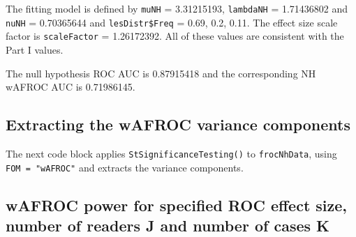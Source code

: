 \documentclass[
]{book}
\newenvironment{Shaded}{\begin{snugshade}}{\end{snugshade}}
\newcommand{\AttributeTok}[1]{\textcolor[rgb]{0.77,0.63,0.00}{#1}}
\newcommand{\FunctionTok}[1]{\textcolor[rgb]{0.00,0.00,0.00}{#1}}
\newcommand{\NormalTok}[1]{#1}
\newcommand{\OtherTok}[1]{\textcolor[rgb]{0.56,0.35,0.01}{#1}}
\newcommand{\SpecialCharTok}[1]{\textcolor[rgb]{0.00,0.00,0.00}{#1}}
\newcommand{\StringTok}[1]{\textcolor[rgb]{0.31,0.60,0.02}{#1}}
\begin{document}
The fitting model is defined by \texttt{muNH} = 3.31215193, \texttt{lambdaNH} = 1.71436802 and \texttt{nuNH} = 0.70365644 and \texttt{lesDistr\$Freq} = 0.69, 0.2, 0.11. The effect size scale factor is \texttt{scaleFactor} = 1.26172392. All of these values are consistent with the Part I values.

\begin{Shaded}
\end{Shaded}

The null hypothesis ROC AUC is 0.87915418 and the corresponding NH wAFROC AUC is 0.71986145.

\hypertarget{extracting-the-wafroc-variance-components}{%
\subsection{Extracting the wAFROC variance components}\label{extracting-the-wafroc-variance-components}}

The next code block applies \texttt{StSignificanceTesting()} to \texttt{frocNhData}, using \texttt{FOM\ =\ "wAFROC"} and extracts the variance components.

\begin{Shaded}
\end{Shaded}

\hypertarget{wafroc-power-for-specified-roc-effect-size-number-of-readers-j-and-number-of-cases-k}{%
\subsection{wAFROC power for specified ROC effect size, number of readers J and number of cases K}\label{wafroc-power-for-specified-roc-effect-size-number-of-readers-j-and-number-of-cases-k}}
\end{document}
